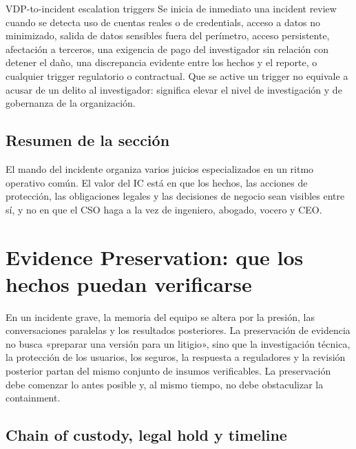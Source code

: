 \documentclass[a4paper]{article}
\begin{document}

\begin{importantbox}{VDP-to-incident escalation triggers}
Se inicia de inmediato una incident review cuando se detecta uso de cuentas reales o de credentials, acceso a datos no minimizado, salida de datos sensibles fuera del perímetro, acceso persistente, afectación a terceros, una exigencia de pago del investigador sin relación con detener el daño, una discrepancia evidente entre los hechos y el reporte, o cualquier trigger regulatorio o contractual. Que se active un trigger no equivale a acusar de un delito al investigador: significa elevar el nivel de investigación y de gobernanza de la organización.
\end{importantbox}

\subsection{Resumen de la sección}

El mando del incidente organiza varios juicios especializados en un ritmo operativo común. El valor del IC está en que los hechos, las acciones de protección, las obligaciones legales y las decisiones de negocio sean visibles entre sí, y no en que el CSO haga a la vez de ingeniero, abogado, vocero y CEO.
\section{Evidence Preservation: que los hechos puedan verificarse}

En un incidente grave, la memoria del equipo se altera por la presión, las conversaciones paralelas y los resultados posteriores. La preservación de evidencia no busca «preparar una versión para un litigio», sino que la investigación técnica, la protección de los usuarios, los seguros, la respuesta a reguladores y la revisión posterior partan del mismo conjunto de insumos verificables. La preservación debe comenzar lo antes posible y, al mismo tiempo, no debe obstaculizar la containment.

\subsection{Chain of custody, legal hold y timeline}
\end{document}
